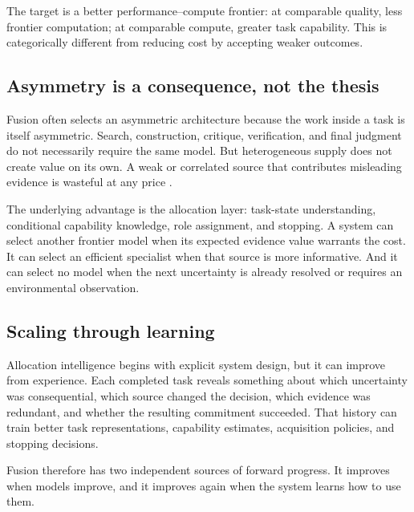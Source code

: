 The target is a better performance--compute frontier: at comparable quality,
less frontier computation; at comparable compute, greater task capability.
This is categorically different from reducing cost by accepting weaker
outcomes.

\subsection{Asymmetry is a consequence, not the thesis}

Fusion often selects an asymmetric architecture because the work inside a task
is itself asymmetric. Search, construction, critique, verification, and final
judgment do not necessarily require the same model. But heterogeneous supply
does not create value on its own. A weak or correlated source that contributes
misleading evidence is wasteful at any price
\citep{li2025rethinkingmoa}.

The underlying advantage is the allocation layer: task-state understanding,
conditional capability knowledge, role assignment, and stopping. A system can
select another frontier model when its expected evidence value warrants the
cost. It can select an efficient specialist when that source is more
informative. And it can select no model when the next uncertainty is already
resolved or requires an environmental observation.

\subsection{Scaling through learning}

Allocation intelligence begins with explicit system design, but it can improve
from experience. Each completed task reveals something about which uncertainty
was consequential, which source changed the decision, which evidence was
redundant, and whether the resulting commitment succeeded. That history can
train better task representations, capability estimates, acquisition policies,
and stopping decisions.

Fusion therefore has two independent sources of forward progress. It improves
when models improve, and it improves again when the system learns how to use
them.

